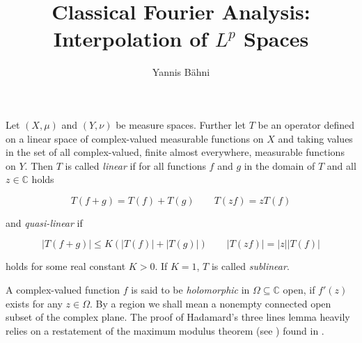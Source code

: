 


\title{Classical Fourier Analysis: Interpolation of $L^p$ Spaces}
\author{Yannis B\"{a}hni}
\address[Yannis B\"{a}hni]{University of Zurich, R\"{a}mistrasse 71, 8006 Zurich}

\maketitle

\addtocounter{section}{1}

\begin{mdframed}
	\begin{definition*}
		Let $(X,\mu)$ and $(Y,\nu)$ be measure spaces. Further let $T$ be an operator defined on a linear space of complex-valued measurable functions on $X$ and taking values in the set of all complex-valued, finite almost everywhere, measurable functions on $Y$. Then $T$ is called \emph{linear} if for all functions $f$ and $g$ in the domain of $T$ and all $z \in \mathbb{C}$ holds

		\begin{equation}
			T\left( f + g \right) = T(f) + T(g) \qquad T\left( zf \right) = zT(f)
			\label{eq:linear}
		\end{equation}

		and \emph{quasi-linear} if

		\begin{equation}
			\left| T\left( f + g \right) \right| \leqslant K \left( \left| T(f)\right| + \left| T(g)\right| \right) \qquad \left| T(zf) \right| = \left| z\right| \left| T(f)\right|
			\label{eq:quasilinear}
		\end{equation}

		holds for some real constant $K > 0$. If $K = 1$, $T$ is called \emph{sublinear}.
	\end{definition*}
\end{mdframed}

\vspace{2mm}

A complex-valued function $f$ is said to be \emph{holomorphic} in $\Omega \subseteq \mathbb{C}$ open, if $f'(z)$ exists for any $z \in \Omega$. By a region we shall mean a nonempty connected open subset of the complex plane. The proof of Hadamard's three lines lemma heavily relies on a restatement of the maximum modulus theorem (see \cite[212]{rudin:rc_analysis:1987}) found in \cite[253]{rudin:rc_analysis:1987}.

